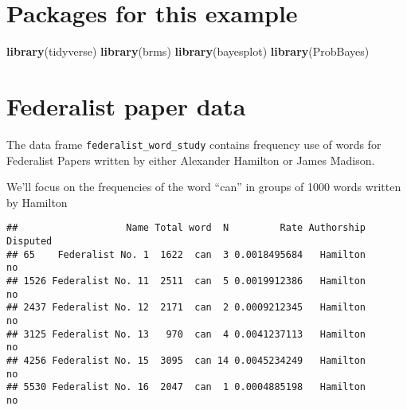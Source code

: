 \documentclass[
]{book}
\newenvironment{Shaded}{\begin{snugshade}}{\end{snugshade}}
\newcommand{\KeywordTok}[1]{\textcolor[rgb]{0.13,0.29,0.53}{\textbf{#1}}}
\newcommand{\NormalTok}[1]{#1}
\newcommand{\OperatorTok}[1]{\textcolor[rgb]{0.81,0.36,0.00}{\textbf{#1}}}
\newcommand{\StringTok}[1]{\textcolor[rgb]{0.31,0.60,0.02}{#1}}
\begin{document}
\hypertarget{packages-for-this-example}{%
\section{Packages for this example}\label{packages-for-this-example}}

\begin{Shaded}
\begin{Highlighting}[]
\KeywordTok{library}\NormalTok{(tidyverse)}
\KeywordTok{library}\NormalTok{(brms)}
\KeywordTok{library}\NormalTok{(bayesplot)}
\KeywordTok{library}\NormalTok{(ProbBayes)}
\end{Highlighting}
\end{Shaded}

\hypertarget{federalist-paper-data}{%
\section{Federalist paper data}\label{federalist-paper-data}}

The data frame \texttt{federalist\_word\_study} contains frequency use of words for Federalist Papers written by either Alexander Hamilton or James Madison.

We'll focus on the frequencies of the word ``can'' in groups of 1000 words written by Hamilton

\begin{Shaded}
\end{Shaded}

\begin{verbatim}
##                   Name Total word  N         Rate Authorship Disputed
## 65    Federalist No. 1  1622  can  3 0.0018495684   Hamilton       no
## 1526 Federalist No. 11  2511  can  5 0.0019912386   Hamilton       no
## 2437 Federalist No. 12  2171  can  2 0.0009212345   Hamilton       no
## 3125 Federalist No. 13   970  can  4 0.0041237113   Hamilton       no
## 4256 Federalist No. 15  3095  can 14 0.0045234249   Hamilton       no
## 5530 Federalist No. 16  2047  can  1 0.0004885198   Hamilton       no
\end{verbatim}
\end{document}
